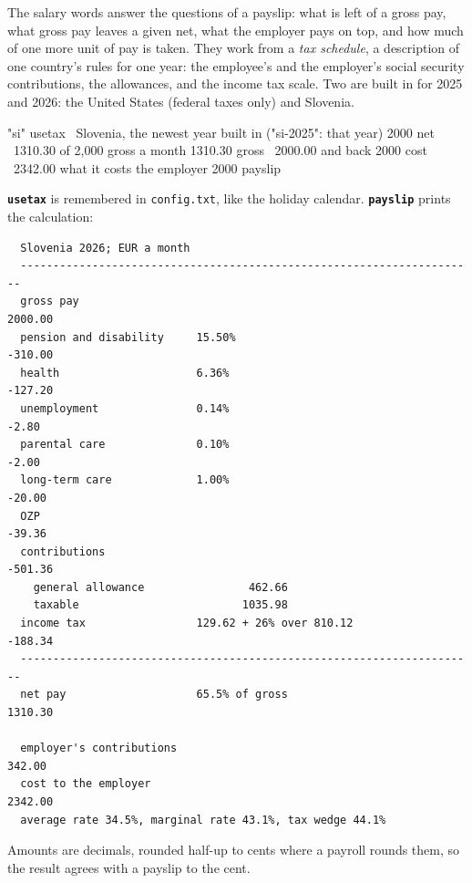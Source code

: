\documentclass[11pt,letterpaper]{article}
\newcommand{\code}[1]{\texttt{#1}}
\newcommand{\cmd}[1]{\texttt{\textbf{#1}}}
\begin{document}
The salary words answer the questions of a payslip: what is left of a gross pay, what gross pay leaves a given net, what the employer pays on top, and how much of one more unit of pay is taken. They work from a \emph{tax schedule}, a description of one country's rules for one year: the employee's and the employer's social security contributions, the allowances, and the income tax scale. Two are built in for 2025 and 2026: the United States (federal taxes only) and Slovenia.
\begin{rpn}
"si" usetax          \ Slovenia, the newest year built in ("si-2025": that year)
2000 net             \ 1310.30   of 2,000 gross a month
1310.30 gross        \ 2000.00   and back
2000 cost            \ 2342.00   what it costs the employer
2000 payslip
\end{rpn}
\cmd{usetax} is remembered in \code{config.txt}, like the holiday calendar. \cmd{payslip} prints the calculation:
\begin{verbatim}
  Slovenia 2026; EUR a month
  ----------------------------------------------------------------------
  gross pay                                                      2000.00
  pension and disability     15.50%                              -310.00
  health                     6.36%                               -127.20
  unemployment               0.14%                                 -2.80
  parental care              0.10%                                 -2.00
  long-term care             1.00%                                -20.00
  OZP                                                             -39.36
  contributions                                                  -501.36
    general allowance                462.66
    taxable                         1035.98
  income tax                 129.62 + 26% over 810.12            -188.34
  ----------------------------------------------------------------------
  net pay                    65.5% of gross                      1310.30

  employer's contributions                                        342.00
  cost to the employer                                           2342.00
  average rate 34.5%, marginal rate 43.1%, tax wedge 44.1%
\end{verbatim}
Amounts are decimals, rounded half-up to cents where a payroll rounds them, so the result agrees with a payslip to the cent.
\end{document}
